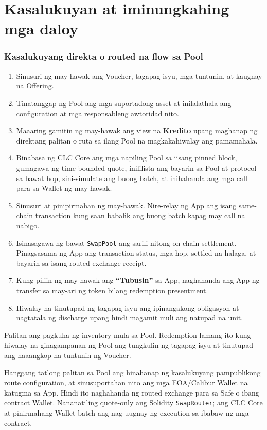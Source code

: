 \documentclass[11pt]{article}
\begin{document}
\section*{Kasalukuyan at iminungkahing mga daloy}

\subsubsection*{Kasalukuyang direkta o routed na flow sa Pool}

\begin{enumerate}[leftmargin=*]
\item Sinusuri ng may-hawak ang Voucher, tagapag-isyu, mga tuntunin, at kaugnay na Offering.
\item Tinatanggap ng Pool ang mga suportadong asset at inilalathala ang configuration at mga responsableng awtoridad nito.
\item Maaaring gamitin ng may-hawak ang view na \textbf{Kredito} upang maghanap ng direktang palitan o ruta sa ilang Pool na magkakahiwalay ang pamamahala.
\item Binabasa ng CLC Core ang mga napiling Pool sa iisang pinned block, gumagawa ng time-bounded quote, inililista ang bayarin sa Pool at protocol sa bawat hop, sini-simulate ang buong batch, at inihahanda ang mga call para sa Wallet ng may-hawak.
\item Sinusuri at pinipirmahan ng may-hawak. Nire-relay ng App ang isang same-chain transaction kung saan babalik ang buong batch kapag may call na nabigo.
\item Isinasagawa ng bawat \texttt{SwapPool} ang sarili nitong on-chain settlement. Pinagsasama ng App ang transaction status, mga hop, settled na halaga, at bayarin sa isang routed-exchange receipt.
\item Kung piliin ng may-hawak ang \textbf{``Tubusin''} sa App, naghahanda ang App ng transfer sa may-ari ng token bilang redemption presentment.
\item Hiwalay na tinutupad ng tagapag-isyu ang ipinangakong obligasyon at nagtatala ng discharge upang hindi magamit muli ang natupad na unit.
\end{enumerate}
Palitan ang pagkuha ng inventory mula sa Pool. Redemption lamang ito kung hiwalay na ginagampanan ng Pool ang tungkulin ng tagapag-isyu at tinutupad ang naaangkop na tuntunin ng Voucher.

Hanggang tatlong palitan sa Pool ang hinahanap ng kasalukuyang pampublikong route configuration, at sinusuportahan nito ang mga EOA/Calibur Wallet na katugma sa App. Hindi ito naghahanda ng routed exchange para sa Safe o ibang contract Wallet. Nananatiling quote-only ang Solidity \texttt{SwapRouter}; ang CLC Core at pinirmahang Wallet batch ang nag-uugnay ng execution sa ibabaw ng mga contract.
\end{document}
